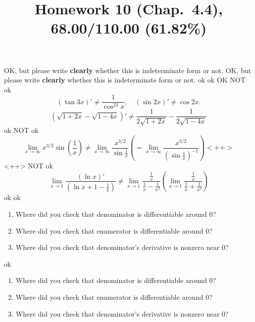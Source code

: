 \documentclass[10pt]{article} %
\title{Homework 10 (Chap.~4.4),
68.00/110.00 (61.82\%)
}
\begin{document}
\maketitle

OK, but please write \textbf{clearly} whether this is indeterminate form or not.
OK, but please write \textbf{clearly} whether this is indeterminate form or not.
ok
ok
OK
NOT ok
\begin{equation*}
	\left( \tan 3x \right)'\neq \frac{1}{\cos^23x},\quad
	\left( \sin 2x \right)'\neq \cos 2x.
\end{equation*}
\begin{equation*}
	\left( 
	\sqrt{1+2x}-\sqrt{1-4x}
	\right)'\neq\frac{1}{2\sqrt{1+2x}}-\frac{1}{2\sqrt{1-4x}}
\end{equation*}
ok
NOT ok
\begin{equation*}
	\lim_{x\to\infty}x^{3/2}\sin\left( \frac{1}{x} \right)
	\neq\lim_{x\to\infty}\frac{x^{3/2}}{\sin\frac{1}{x}}\left( 
		=\lim_{x\to\infty}\frac{x^{3/2}}{\left( \sin\frac{1}{x} \right)^{-1}}
	\right)<++>
\end{equation*}<++>
NOT ok
\begin{equation*}
	\lim_{x\to1}\frac{\left( \ln x \right)'}{\left( \ln x+1-\frac{1}{x} \right)}\neq
	\lim_{x\to1}\frac{\frac{1}{x}}{\frac{1}{x}-\frac{1}{x^2}}\left( 
		\lim_{x\to1}\frac{\frac{1}{x}}{\frac{1}{x}+\frac{1}{x^2}}
	\right)
\end{equation*}
ok
ok
\begin{enumerate}
	\item 
		Where did you check that denominator is differentiable around 0?
	\item 
		Where did you check that  enumerator is differentiable around 0?
	\item Where did you check that denominator's derivative is nonzero near 0?
\end{enumerate}
ok
\begin{enumerate}
	\item 
		Where did you check that denominator is differentiable around 0?
	\item 
		Where did you check that  enumerator is differentiable around 0?
	\item Where did you check that denominator's derivative is nonzero near 0?
\end{enumerate}
\end{document}
